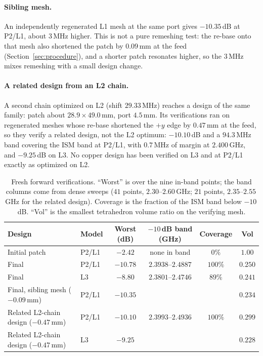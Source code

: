 \documentclass{anvil-paper}
\newcommand{\PL}{P2/L1}
\begin{document}
\paragraph{Sibling mesh.}
An independently regenerated L1 mesh at the same port gives $-10.35$\,dB at
\PL, about $3$\,MHz higher. This is not a pure remeshing test: the re-base
onto that mesh also shortened the patch by $0.09$\,mm at the feed
(Section~\ref{sec:procedure}), and a shorter patch resonates higher, so the
$3$\,MHz mixes remeshing with a small design change.

\paragraph{A related design from an L2 chain.}
A second chain optimized on L2 (shift $29.33$\,MHz) reaches a design of the
same family: patch about $28.9\times49.0$\,mm, port $4.5$\,mm. Its
verifications ran on regenerated meshes whose re-base shortened the $+y$
edge by $0.47$\,mm at the feed, so they verify a related design, not the L2
optimum: $-10.10$\,dB and a $94.3$\,MHz band covering the ISM band at \PL,
with $0.7$\,MHz of margin at $2.400$\,GHz, and $-9.25$\,dB on L3. No copper
design has been verified on L3 and at \PL{} exactly as optimized on L2.

\begin{table}[t]
  \centering
  \caption{Fresh forward verifications. ``Worst'' is over the nine in-band
  points; the band columns come from dense sweeps ($41$ points,
  $2.30$--$2.60$\,GHz; $21$ points, $2.35$--$2.55$\,GHz for the related
  design). Coverage is the fraction of the ISM band below $-10$\,dB.
  ``Vol'' is the smallest tetrahedron volume ratio on the verifying mesh.}
  \label{tab:verify}
  \small
  \begin{tabular}{@{}l l c c c c@{}}
    \toprule
    Design & Model & Worst (dB) & $-10$\,dB band (GHz) & Coverage & Vol \\
    \midrule
    Initial patch & \PL & $-2.42$ & none in band & $0\%$ & $1.00$ \\
    Final & \PL & $-10.78$ & $2.3938$--$2.4887$ & $100\%$ & $0.250$ \\
    Final & L3 & $-8.80$ & $2.3801$--$2.4746$ & $89\%$ & $0.241$ \\
    Final, sibling mesh ($-0.09$\,mm) & \PL & $-10.35$ & & & $0.234$ \\
    Related L2-chain design ($-0.47$\,mm) & \PL & $-10.10$ & $2.3993$--$2.4936$ & $100\%$ & $0.299$ \\
    Related L2-chain design ($-0.47$\,mm) & L3 & $-9.25$ & & & $0.228$ \\
    \bottomrule
  \end{tabular}
\end{table}
\end{document}

